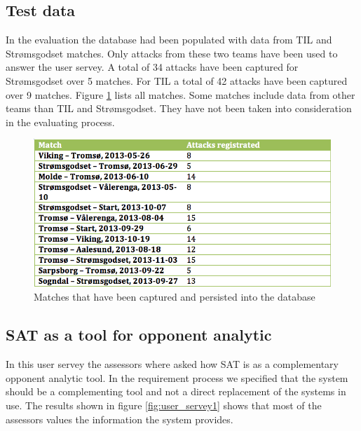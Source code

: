 \subsection{Test data}

In the evaluation the database had been populated with data from \ac{TIL} and Str{\o}msgodset matches. Only attacks from these two teams have been used to answer the user servey. A total of 34 attacks have been captured for Str{\o}msgodset over 5 matches. For \ac{TIL} a total of 42 attacks have been captured over 9 matches. Figure \ref{fig:matches_regged} lists all matches. Some matches include data from other teams than \ac{TIL} and Str{\o}msgodset. They have not been taken into consideration in the evaluating process.

\begin{figure}[ht!]
\centering
\includegraphics[width=1\textwidth]{images/evaluation/matched_regged.png}
\caption{Matches that have been captured and persisted into the database}
\label{fig:matches_regged}
\end{figure}

\subsection{SAT as a tool for opponent analytic}

In this user servey the assessors where asked how SAT is as a complementary opponent analytic tool. In the requirement process we specified that the system should be a complementing tool and not a direct replacement of the systems in use. The results shown in figure \ref{fig:user_servey1} shows that most of the assessors values the information the system provides. 

